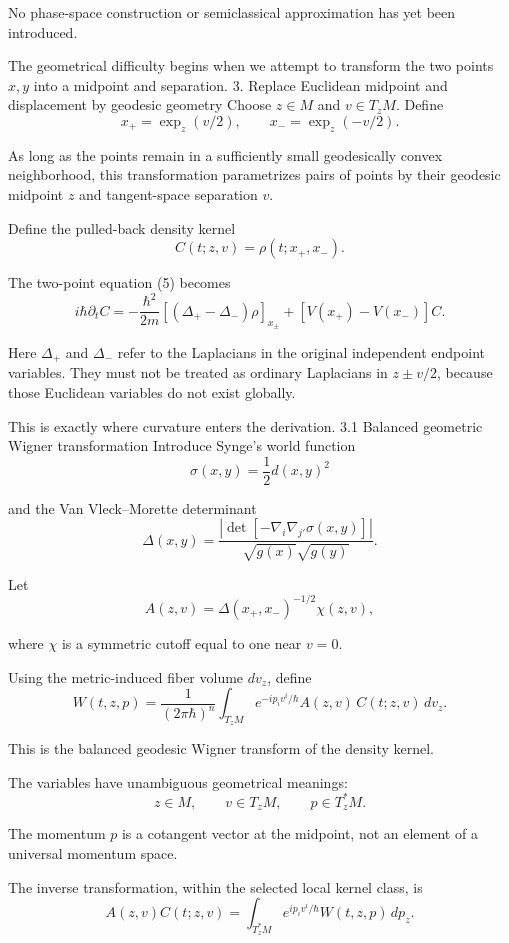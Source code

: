 No phase-space construction or semiclassical approximation has yet been introduced.

The geometrical difficulty begins when we attempt to transform the two points \(x,y\) into a midpoint and separation.
3. Replace Euclidean midpoint and displacement by geodesic geometry
Choose \(z\in M\) and \(v\in T_zM\). Define
\[
x_+=\exp_z(v/2),
\qquad
x_-=\exp_z(-v/2).
\tag{6}
\]

As long as the points remain in a sufficiently small geodesically convex neighborhood, this transformation parametrizes pairs of points by their geodesic midpoint \(z\) and tangent-space separation \(v\).

Define the pulled-back density kernel
\[
C(t;z,v)=\rho(t;x_+,x_-).
\tag{7}
\]

The two-point equation (5) becomes
\[
\boxed{
i\hbar\partial_tC
=
-\frac{\hbar^2}{2m}
\left[(\Delta_+-\Delta_-)\rho\right]_{x_\pm}
+
[V(x_+)-V(x_-)]C.
}
\tag{8}
\]

Here \(\Delta_+\) and \(\Delta_-\) refer to the Laplacians in the original independent endpoint variables. They must not be treated as ordinary Laplacians in \(z\pm v/2\), because those Euclidean variables do not exist globally.

This is exactly where curvature enters the derivation.
3.1 Balanced geometric Wigner transformation
Introduce Synge's world function
\[
\sigma(x,y)=\frac12d(x,y)^2
\tag{9}
\]

and the Van Vleck–Morette determinant
\[
\Delta(x,y)=
\frac{
|\det[-\nabla_i\nabla_{j'}\sigma(x,y)]|
}{
\sqrt{g(x)}\sqrt{g(y)}
}.
\tag{10}
\]

Let
\[
A(z,v)=\Delta(x_+,x_-)^{-1/2}\chi(z,v),
\tag{11}
\]

where \(\chi\) is a symmetric cutoff equal to one near \(v=0\).

Using the metric-induced fiber volume \(dv_z\), define
\[
\boxed{
W(t,z,p)=
\frac1{(2\pi\hbar)^n}
\int_{T_zM}
e^{-ip_iv^i/\hbar}
A(z,v)\,C(t;z,v)\,dv_z.
}
\tag{12}
\]

This is the balanced geodesic Wigner transform of the density kernel.

The variables have unambiguous geometrical meanings:
\[
z\in M,\qquad
v\in T_zM,\qquad
p\in T_z^*M.
\]

The momentum \(p\) is a cotangent vector at the midpoint, not an element of a universal momentum space.

The inverse transformation, within the selected local kernel class, is
\[
\boxed{
A(z,v)C(t;z,v)
=
\int_{T_z^*M}
e^{ip_iv^i/\hbar}
W(t,z,p)\,dp_z.
}
\tag{13}
\]

